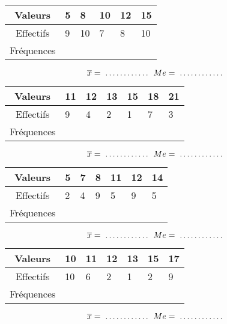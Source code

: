 \begin{multicols}{2}

\begin{center}
\begin{tabular}{c*{5}{|p{0.5cm}}}
 Valeurs  & 5 & 8 & 10 & 12 & 15\\ \hline 
 Effectifs  & 9 & 10 & 7 & 8 & 10\\ \hline 
 Fréquences &  &  &  &  & \\[0.5cm]
\end{tabular}
\end{center}$$\overline{x}=\filling ~ Me=\filling$$


\begin{center}
\begin{tabular}{c*{6}{|p{0.5cm}}}
 Valeurs  & 11 & 12 & 13 & 15 & 18 & 21\\ \hline 
 Effectifs  & 9 & 4 & 2 & 1 & 7 & 3\\ \hline 
 Fréquences &  &  &  &  &  & \\[0.5cm]
\end{tabular}
\end{center}$$\overline{x}=\filling ~ Me=\filling$$


\begin{center}
\begin{tabular}{c*{6}{|p{0.5cm}}}
 Valeurs  & 5 & 7 & 8 & 11 & 12 & 14\\ \hline 
 Effectifs  & 2 & 4 & 9 & 5 & 9 & 5\\ \hline 
 Fréquences &  &  &  &  &  & \\[0.5cm]
\end{tabular}
\end{center}$$\overline{x}=\filling ~ Me=\filling$$


\begin{center}
\begin{tabular}{c*{6}{|p{0.5cm}}}
 Valeurs  & 10 & 11 & 12 & 13 & 15 & 17\\ \hline 
 Effectifs  & 10 & 6 & 2 & 1 & 2 & 9\\ \hline 
 Fréquences &  &  &  &  &  & \\[0.5cm]
\end{tabular}
\end{center}$$\overline{x}=\filling ~ Me=\filling$$

\end{multicols}